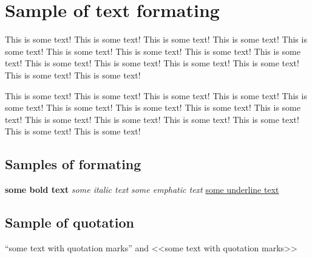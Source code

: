 
\title{}
\author{max-wn}
\date{April 12, 1961}



\maketitle

\newpage
\begin{abstract}
This is some text! This is some text! This is some text! This is some text! This is some text! This is some text! This is some text! This is some text! This is some text! This is some text! This is some text! This is some text! This is some text! This is some text! This is some text!
\end{abstract}

\newpage
\tableofcontents

\section{Sample of text formating}
This is some text! This is some text! This is some text! This is some text! This is some text! This is some text! This is some text! This is some text! This is some text! This is some text! This is some text! This is some text! This is some text! This is some text! This is some text!

This is some text! This is some text! This is some text! This is some text! This is some text! This is some text! This is some text! This is some text! This is some text! This is some text! This is some text! This is some text! This is some text! This is some text! This is some text!

\subsection{Samples of formating}
\textbf{some bold text}
\textit{some italic text}
\emph{some emphatic text}
\underline{some underline text}

\subsection{Sample of quotation}
``some text with quotation marks'' and  <<some text with quotation marks>>

